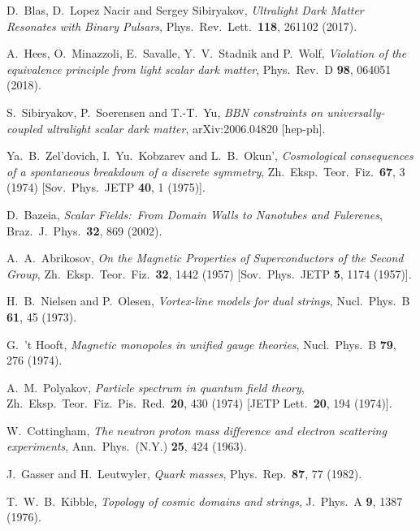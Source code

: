 \documentclass[aps,prd,onecolumn,nofootinbib]{revtex4-2} %
\begin{document}
\begin{thebibliography}{99}
 D.~Blas, D.~Lopez Nacir and Sergey Sibiryakov, \textit{Ultralight Dark Matter Resonates with Binary Pulsars}, Phys.~Rev.~Lett.~\textbf{118}, 261102 (2017). 

 A.~Hees, O.~Minazzoli, E.~Savalle, Y.~V.~Stadnik and P.~Wolf, \textit{Violation of the equivalence principle from light scalar dark matter}, Phys.~Rev.~D \textbf{98}, 064051 (2018). 

 S.~Sibiryakov, P.~Soerensen and T.-T.~Yu, \textit{BBN constraints on universally-coupled ultralight scalar dark matter}, arXiv:2006.04820 [hep-ph]. 



 Ya.~B.~Zel'dovich, I.~Yu.~Kobzarev and L.~B.~Okun', \textit{Cosmological consequences of a spontaneous breakdown of a discrete symmetry}, Zh.~Eksp.~Teor.~Fiz.~\textbf{67}, 3 (1974) [Sov.~Phys.~JETP \textbf{40}, 1 (1975)]. 

 D.~Bazeia, \textit{Scalar Fields:~From Domain Walls to Nanotubes and Fulerenes}, Braz.~J.~Phys.~\textbf{32}, 869 (2002). 

 A.~A.~Abrikosov, \textit{On the Magnetic Properties of Superconductors of the Second Group}, Zh.~Eksp.~Teor.~Fiz.~\textbf{32}, 1442 (1957) [Sov.~Phys.~JETP \textbf{5}, 1174 (1957)]. 

 H.~B.~Nielsen and P.~Olesen, \textit{Vortex-line models for dual strings}, Nucl.~Phys.~B \textbf{61}, 45 (1973). 

 G.~'t Hooft, \textit{Magnetic monopoles in unified gauge theories}, Nucl.~Phys.~B \textbf{79}, 276 (1974). 

 A.~M.~Polyakov, \textit{Particle spectrum in quantum field theory}, Zh.~Eksp.~Teor.~Fiz.~Pis.~Red.~\textbf{20}, 430 (1974) [JETP Lett.~\textbf{20}, 194 (1974)]. 


 W.~Cottingham, \textit{The neutron proton mass difference and electron scattering experiments}, Ann.~Phys.~(N.Y.) \textbf{25}, 424 (1963). 

 J.~Gasser and H.~Leutwyler, \textit{Quark masses}, Phys.~Rep.~\textbf{87}, 77 (1982). 


 T.~W.~B.~Kibble, \textit{Topology of cosmic domains and strings}, J.~Phys.~A \textbf{9}, 1387 (1976). 


\end{thebibliography}
\end{document}
